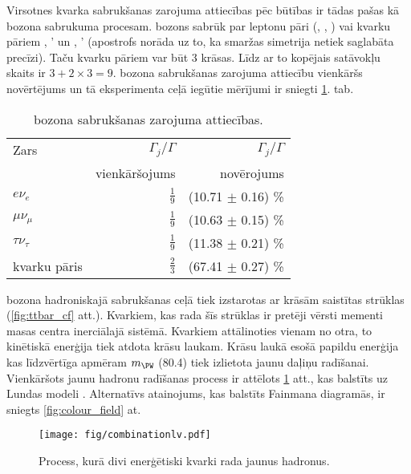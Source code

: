 Virsotnes kvarka sabrukšanas zarojuma attiecības pēc būtības ir tādas pašas kā \PW bozona sabrukuma procesam. \PW bozons sabrūk par leptonu pāri (\Pe\Pgne, \Pgm\Pgngm, \Pgt\Pgngt) vai kvarku pāriem \cPqu, \cPqd' un \cPqc, \cPqs' (apostrofs norāda uz to, ka smaržas simetrija netiek saglabāta precīzi). Taču kvarku pāriem var būt 3 krāsas. Līdz ar to kopējais satāvokļu skaits ir $3+2\times3=9$. \PW bozona sabrukšanas zarojuma attiecību vienkāršs novērtējums un tā eksperimenta ceļā iegūtie mērījumi ir sniegti \ref{tab:W_br}. tab.

\begin{table}[h!]
  \centering
  \caption{\PW bozona sabrukšanas zarojuma attiecības.}
  \label{tab:W_br}
  \begin{tabular}{l r r}
    Zars                  & $\Gamma_{j}/\Gamma$ & $\Gamma_{j}/\Gamma$\\
                          & vienkāršojums       & novērojums \cite{Patrignani:2016xqp}\\
    \hline
    $e\nu_{e}$            & $\frac{1}{9}$       & (10.71 $\pm$ 0.16) \%\\
    $\mu\nu_{\mu}$        & $\frac{1}{9}$       & (10.63 $\pm$ 0.15) \%\\
    $\tau\nu_{\tau}$      & $\frac{1}{9}$       & (11.38 $\pm$ 0.21) \%\\
    kvarku pāris          & $\frac{2}{3}$       & (67.41 $\pm$ 0.27) \%
  \end{tabular}
\end{table}

\PW bozona hadroniskajā sabrukšanas ceļā tiek izstarotas ar krāsām saistītas strūklas (\ref{fig:ttbar_cf} att.). Kvarkiem, kas rada šīs strūklas ir pretēji vērsti mementi masas centra inerciālajā sistēmā. Kvarkiem attālinoties vienam no otra, to kinētiskā enerģija tiek atdota krāsu laukam. Krāsu laukā esošā papildu enerģija kas līdzvērtīga apmēram $m_{\PW}$ (80.4\GeV) tiek izlietota jaunu daļiņu radīšanai. Vienkāršots jaunu hadronu radīšanas process ir attēlots \ref{fig:combination} att., kas balstīts uz Lundas modeli \cite{Andersson:1983ia}. Alternatīvs atainojums, kas balstīts Fainmana diagramās, ir sniegts \ref{fig:colour_field} at.

\begin{figure}[htp]
  \centering
  \texttt{[image: fig/combinationlv.pdf]}
  \caption{Process, kurā divi enerģētiski kvarki rada jaunus hadronus.}
  \label{fig:combination}
\end{figure}

